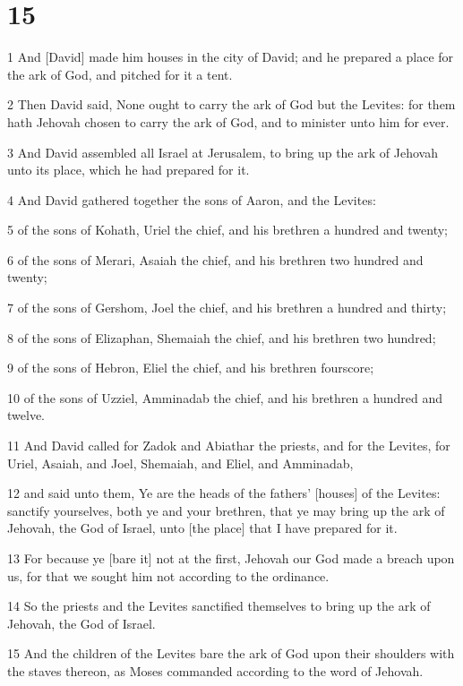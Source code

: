 \chapter{15}

\par 1 And [David] made him houses in the city of David; and he prepared a place for the ark of God, and pitched for it a tent.
\par 2 Then David said, None ought to carry the ark of God but the Levites: for them hath Jehovah chosen to carry the ark of God, and to minister unto him for ever.
\par 3 And David assembled all Israel at Jerusalem, to bring up the ark of Jehovah unto its place, which he had prepared for it.
\par 4 And David gathered together the sons of Aaron, and the Levites:
\par 5 of the sons of Kohath, Uriel the chief, and his brethren a hundred and twenty;
\par 6 of the sons of Merari, Asaiah the chief, and his brethren two hundred and twenty;
\par 7 of the sons of Gershom, Joel the chief, and his brethren a hundred and thirty;
\par 8 of the sons of Elizaphan, Shemaiah the chief, and his brethren two hundred;
\par 9 of the sons of Hebron, Eliel the chief, and his brethren fourscore;
\par 10 of the sons of Uzziel, Amminadab the chief, and his brethren a hundred and twelve.
\par 11 And David called for Zadok and Abiathar the priests, and for the Levites, for Uriel, Asaiah, and Joel, Shemaiah, and Eliel, and Amminadab,
\par 12 and said unto them, Ye are the heads of the fathers' [houses] of the Levites: sanctify yourselves, both ye and your brethren, that ye may bring up the ark of Jehovah, the God of Israel, unto [the place] that I have prepared for it.
\par 13 For because ye [bare it] not at the first, Jehovah our God made a breach upon us, for that we sought him not according to the ordinance.
\par 14 So the priests and the Levites sanctified themselves to bring up the ark of Jehovah, the God of Israel.
\par 15 And the children of the Levites bare the ark of God upon their shoulders with the staves thereon, as Moses commanded according to the word of Jehovah.
